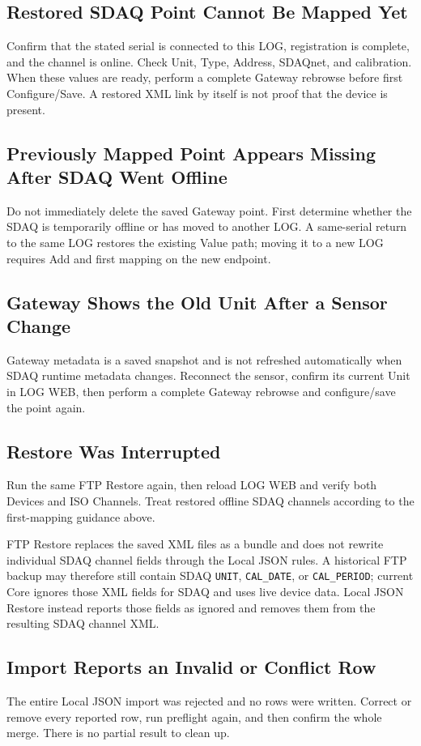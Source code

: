 \documentclass[11pt,a4paper]{article}
\begin{document}
\subsection{Restored SDAQ Point Cannot Be Mapped Yet}
Confirm that the stated serial is connected to this LOG, registration is complete, and the channel is online. Check Unit, Type, Address, SDAQnet, and calibration. When these values are ready, perform a complete Gateway rebrowse before first Configure/Save. A restored XML link by itself is not proof that the device is present.

\subsection{Previously Mapped Point Appears Missing After SDAQ Went Offline}
Do not immediately delete the saved Gateway point. First determine whether the SDAQ is temporarily offline or has moved to another LOG. A same-serial return to the same LOG restores the existing Value path; moving it to a new LOG requires Add and first mapping on the new endpoint.

\subsection{Gateway Shows the Old Unit After a Sensor Change}
Gateway metadata is a saved snapshot and is not refreshed automatically when SDAQ runtime metadata changes. Reconnect the sensor, confirm its current Unit in LOG WEB, then perform a complete Gateway rebrowse and configure/save the point again.

\subsection{Restore Was Interrupted}
Run the same FTP Restore again, then reload LOG WEB and verify both Devices and ISO Channels. Treat restored offline SDAQ channels according to the first-mapping guidance above.

FTP Restore replaces the saved XML files as a bundle and does not rewrite individual SDAQ channel fields through the Local JSON rules. A historical FTP backup may therefore still contain SDAQ \texttt{UNIT}, \texttt{CAL\_DATE}, or \texttt{CAL\_PERIOD}; current Core ignores those XML fields for SDAQ and uses live device data. Local JSON Restore instead reports those fields as ignored and removes them from the resulting SDAQ channel XML.

\subsection{Import Reports an Invalid or Conflict Row}
The entire Local JSON import was rejected and no rows were written. Correct or remove every reported row, run preflight again, and then confirm the whole merge. There is no partial result to clean up.
\end{document}
